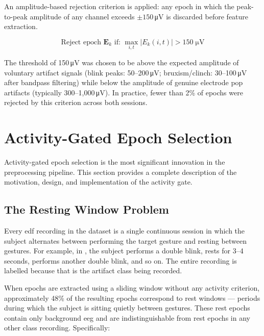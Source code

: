 An amplitude-based rejection criterion is applied: any epoch
in which the peak-to-peak amplitude of any channel exceeds
$\pm 150$\,\si{\micro\volt} is discarded before feature
extraction.

\begin{equation}
\text{Reject epoch } \mathbf{E}_k \text{ if: }
\max_{i,t}\left|E_k(i,t)\right| > 150\;\si{\micro\volt}
\label{eq:amplitude_reject}
\end{equation}

The threshold of 150\,\si{\micro\volt} was chosen to be above
the expected amplitude of voluntary artifact signals
(blink peaks: 50--200\,\si{\micro\volt}; bruxism/clinch:
30--100\,\si{\micro\volt} after bandpass filtering) while
below the amplitude of genuine electrode pop artifacts
(typically 300--1{,}000\,\si{\micro\volt}). In practice,
fewer than 2\% of epochs were rejected by this criterion
across both sessions.

\section{Activity-Gated Epoch Selection}
\label{sec:sp_gate}

Activity-gated epoch selection is the most significant
innovation in the preprocessing pipeline. This section provides
a complete description of the motivation, design, and
implementation of the activity gate.

\subsection{The Resting Window Problem}

Every \acrshort{edf} recording in the dataset is a single
continuous session in which the subject alternates between
performing the target gesture and resting between gestures.
For example, in , the subject performs a
double blink, rests for 3--4 seconds, performs another double
blink, and so on. The entire recording is labelled
 because that is the artifact class being
recorded.

When epochs are extracted using a sliding window without any
activity criterion, approximately 48\% of the resulting epochs
correspond to rest windows — periods during which the subject
is sitting quietly between gestures. These rest epochs contain
only background \acrshort{eeg} and are indistinguishable from
rest epochs in any other class recording. Specifically:

